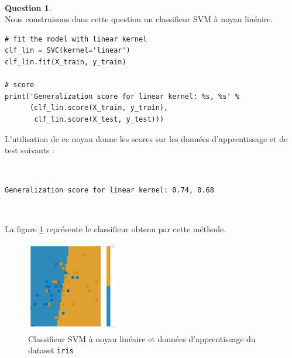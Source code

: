 \documentclass[11pt,a4paper]{article}
\theoremstyle{definition}
\newtheorem{Qu}{Question}
\begin{document}
\

\begin{Qu}~\\

 Nous construisons dans cette question un classifieur SVM à noyau linéaire. 

\begin{verbatim}
# fit the model with linear kernel
clf_lin = SVC(kernel='linear')
clf_lin.fit(X_train, y_train)

# score
print('Generalization score for linear kernel: %s, %s' %
      (clf_lin.score(X_train, y_train),
       clf_lin.score(X_test, y_test)))
\end{verbatim}

L'utilisation de ce noyau donne les scores sur les données d'apprentissage et de test suivants :

\

\texttt{Generalization score for linear kernel: 0.74, 0.68}

\

La figure \ref{qu1} représente le classifieur obtenu par cette méthode.

\begin{figure}[h!]\centering
\includegraphics[width=4cm]{Images/qu1.png}
\caption{Classifieur SVM à noyau linéaire et données d'apprentissage du dataset \texttt{iris}}
\label{qu1}
\end{figure}


\end{Qu}

\
\end{document}
